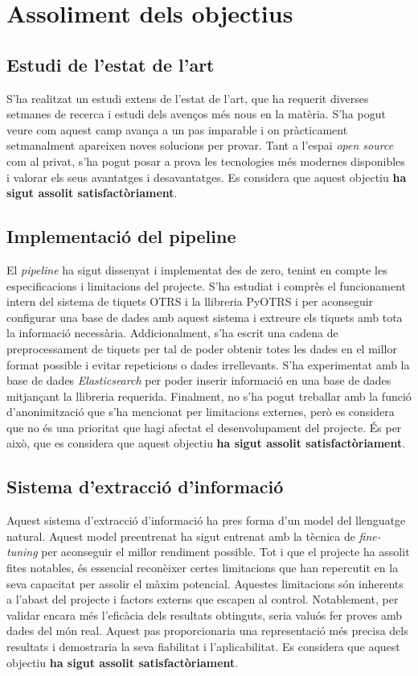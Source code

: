 \section{Assoliment dels objectius}

\subsection{Estudi de l'estat de l'art}
S'ha realitzat un estudi extens de l'estat de l'art, que ha requerit diverses setmanes de recerca i estudi dels avenços més nous en la matèria. S'ha pogut veure com aquest camp avança a un pas imparable i on pràcticament setmanalment apareixen noves solucions per provar. Tant a l'espai \textit{open source} com al privat, s'ha pogut posar a prova les tecnologies més modernes disponibles i valorar els seus avantatges i desavantatges. Es considera que aquest objectiu \textbf{ha sigut assolit satisfactòriament}.

\subsection{Implementació del pipeline}
El \textit{pipeline} ha sigut dissenyat i implementat des de zero, tenint en compte les especificacions i limitacions del projecte. S'ha estudiat i comprès el funcionament intern del sistema de tiquets OTRS i la llibreria PyOTRS i per aconseguir configurar una base de dades amb aquest sistema i extreure els tiquets amb tota la informació necessària. Addicionalment, s'ha escrit una cadena de preprocessament de tiquets per tal de poder obtenir totes les dades en el millor format possible i evitar repeticions o dades irrellevants. S'ha experimentat amb la base de dades \textit{Elasticsearch} per poder inserir informació en una base de dades mitjançant la llibreria requerida. Finalment, no s'ha pogut treballar amb la funció d'anonimització que s'ha mencionat per limitacions externes, però es considera que no és una prioritat que hagi afectat el desenvolupament del projecte. És per això, que es considera que aquest objectiu \textbf{ha sigut assolit satisfactòriament}.

\subsection{Sistema d'extracció d'informació}
Aquest sistema d'extracció d'informació ha pres forma d'un model del llenguatge natural. Aquest model preentrenat ha sigut entrenat amb la tècnica de \textit{fine-tuning} per aconseguir el millor rendiment possible. Tot i que el projecte ha assolit fites notables, és essencial reconèixer certes limitacions que han repercutit en la seva capacitat per assolir el màxim potencial. Aquestes limitacions són inherents a l'abast del projecte i factors externs que escapen al control. Notablement, per validar encara més l'eficàcia dels resultats obtinguts, seria valuós fer proves amb dades del món real. Aquest pas proporcionaria una representació més precisa dels resultats i demostraria la seva fiabilitat i l'aplicabilitat. Es considera que aquest objectiu \textbf{ha sigut assolit satisfactòriament}.

